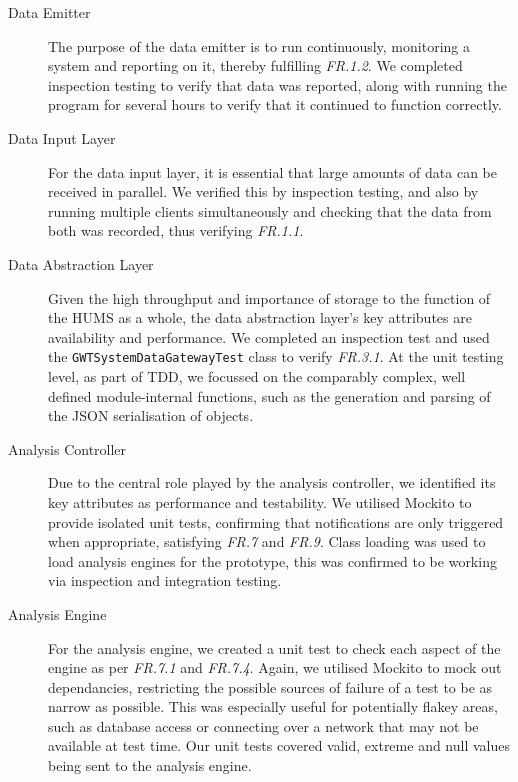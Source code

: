 \documentclass[10pt,a4paper]{article}
\newcommand{\frit}[1]{\textit{FR.#1}}
\begin{document}
\begin{description}

  \item[Data Emitter] The purpose of the data emitter is to run
    continuously, monitoring a system and reporting on it, thereby
    fulfilling \frit{1.2}. We completed inspection testing to verify 
    that data was reported, along with running the program for 
    several hours to verify that it continued to function correctly.

  \item[Data Input Layer] For the data input layer, it is essential that large
    amounts of data can be received in parallel. We verified this by
    inspection testing, and also by running multiple clients simultaneously and
    checking that the data from both was recorded, thus verifying \frit{1.1}.

  \item[Data Abstraction Layer] Given the high throughput and
    importance of storage to the function of the HUMS as a whole, the
    data abstraction layer's key attributes are availability and
    performance. We completed an inspection test and used the 
    \texttt{GWTSystemDataGatewayTest} class to verify \frit{3.1}. At the unit 
    testing level, as  part of TDD, we focussed on the comparably complex,
    well defined module-internal functions, such as the generation and 
    parsing of the JSON serialisation of objects.
    
  \item[Analysis Controller] Due to the central role played by the 
  analysis controller, we identified its key 
  attributes as performance and testability. We utilised Mockito to 
  provide isolated unit tests, confirming that notifications 
  are only triggered when appropriate, satisfying \frit{7} and \frit{9}.
  Class loading was used to load analysis engines for 
  the prototype, this was confirmed to be working via inspection and 
  integration testing.
  
  \item[Analysis Engine]
   For the analysis engine, we created a unit test to check each aspect of the 
   engine as per \frit{7.1} and \frit{7.4}. Again, we utilised Mockito to mock out
   dependancies, restricting the possible sources of failure of a test to be 
   as narrow as possible. This was especially useful for potentially flakey 
   areas, such as database access or connecting over a network that may 
   not be available at test time. Our unit tests covered valid, extreme and 
   null values being sent to the analysis engine.


\end{description}
\end{document}
